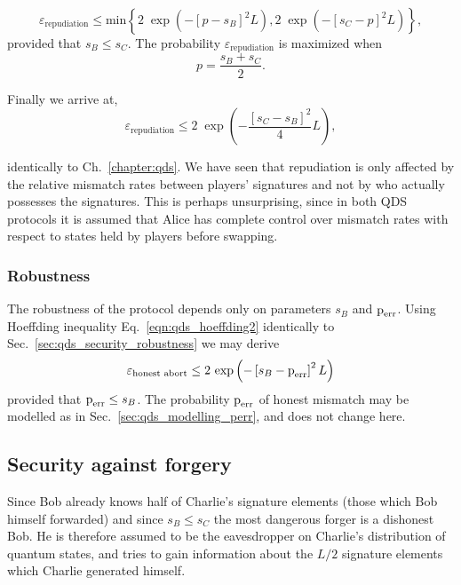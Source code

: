 \begin{equation}
\varepsilon_{\text{repudiation}} \le \text{min}\left\{ 2 \; \exp\left(-\left[ p - s_B\right]^2 L\right), 2 \; \exp\left( - \left[ s_C - p\right]^2 L\right) \right\},
\end{equation}
\noindent 
provided that $s_B \le s_C$. The probability $\varepsilon_{\text{repudiation}}$ is maximized when
\begin{equation}
p = \frac{s_B + s_C}{2}.
\end{equation}

\noindent Finally we arrive at,
\begin{equation}\label{eqn:aqc_repudiation}
\varepsilon_{\text{repudiation}} \le 2 \; \exp\left( - \frac{\left[s_C - s_B\right]^2}{4}L\right),
\end{equation}

\noindent identically to Ch.~\ref{chapter:qds}. We have seen that repudiation is only affected by the relative mismatch rates between players' signatures and not by who actually possesses the signatures. This is perhaps unsurprising, since in both QDS protocols it is assumed that Alice has complete control over mismatch rates with respect to states held by players before swapping.

\subsubsection{Robustness}
The robustness of the protocol depends only on parameters $s_B$ and $\text{p}_{\text{err}}$. Using Hoeffding inequality Eq.~\ref{eqn:qds_hoeffding2} identically to Sec.~\ref{sec:qds_security_robustness} we may derive 
\begin{equation}\label{eqn:aqc_robustness}
\varepsilon_{\text{honest abort}} \le 2 \, \exp\left( - \left[s_B - \text{p}_{\text{err}}\right]^2 L\right)
\end{equation}
provided that $\text{p}_{\text{err}} \le s_B$. The probability $\text{p}_{\text{err}}$ of honest mismatch may be modelled as in Sec.~\ref{sec:qds_modelling_perr}, and does not change here.

\subsection{Security against forgery}
Since Bob already knows half of Charlie's signature elements (those which Bob himself forwarded) and since $s_B \le s_C$ the most dangerous forger is a dishonest Bob. He is therefore assumed to be the eavesdropper on Charlie's distribution of quantum states, and tries to gain information about the $L/2$ signature elements which Charlie generated himself.

